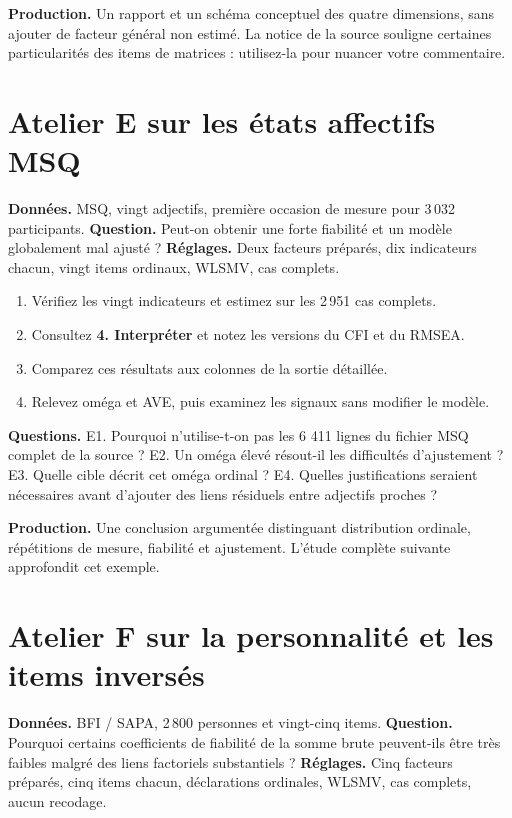 \documentclass[
  french,
  11pt,
  a4paper,
  DIV=11,
  numbers=noendperiod]{scrreprt}
\providecommand{\tightlist}{%
  \setlength{\itemsep}{0pt}\setlength{\parskip}{0pt}}
\begin{document}
\textbf{Production.} Un rapport et un schéma conceptuel des quatre
dimensions, sans ajouter de facteur général non estimé. La notice de la
source souligne certaines particularités des items de matrices :
utilisez-la pour nuancer votre commentaire.

\section{Atelier E sur les états affectifs
MSQ}\label{atelier-e-sur-les-uxe9tats-affectifs-msq}

\textbf{Données.} MSQ, vingt adjectifs, première occasion de mesure pour
3\,032 participants. \textbf{Question.} Peut-on obtenir une forte
fiabilité et un modèle globalement mal ajusté ? \textbf{Réglages.} Deux
facteurs préparés, dix indicateurs chacun, vingt items ordinaux, WLSMV,
cas complets.

\begin{enumerate}
\def\labelenumi{\arabic{enumi}.}
\tightlist
\item
  Vérifiez les vingt indicateurs et estimez sur les 2\,951 cas complets.
\item
  Consultez \textbf{4. Interpréter} et notez les versions du CFI et du
  RMSEA.
\item
  Comparez ces résultats aux colonnes de la sortie détaillée.
\item
  Relevez oméga et AVE, puis examinez les signaux sans modifier le
  modèle.
\end{enumerate}

\textbf{Questions.} E1. Pourquoi n'utilise-t-on pas les 6 411 lignes du
fichier MSQ complet de la source ? E2. Un oméga élevé résout-il les
difficultés d'ajustement ? E3. Quelle cible décrit cet oméga ordinal ?
E4. Quelles justifications seraient nécessaires avant d'ajouter des
liens résiduels entre adjectifs proches ?

\textbf{Production.} Une conclusion argumentée distinguant distribution
ordinale, répétitions de mesure, fiabilité et ajustement. L'étude
complète suivante approfondit cet exemple.

\section{Atelier F sur la personnalité et les items
inversés}\label{atelier-f-sur-la-personnalituxe9-et-les-items-inversuxe9s}

\textbf{Données.} BFI / SAPA, 2\,800 personnes et vingt-cinq items.
\textbf{Question.} Pourquoi certains coefficients de fiabilité de la
somme brute peuvent-ils être très faibles malgré des liens factoriels
substantiels ? \textbf{Réglages.} Cinq facteurs préparés, cinq items
chacun, déclarations ordinales, WLSMV, cas complets, aucun recodage.
\end{document}
